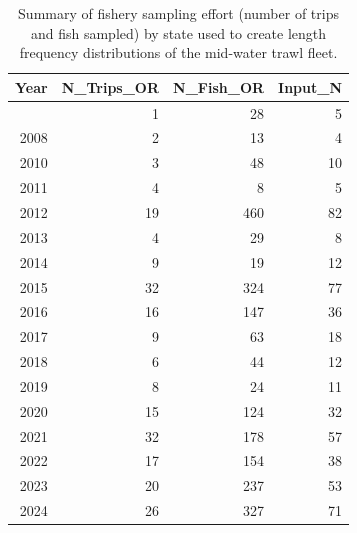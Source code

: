 \documentclass[
]{scrartcl}
\begin{document}
\begin{longtable}{rrrrrrrr}
\end{longtable}

\endgroup

\newpage{}

\begingroup
\fontsize{9.0pt}{10.8pt}\selectfont

\begin{longtable}{rrrr}

\caption{\label{tbl-MDT_lengths_sample_sizes}Summary of fishery sampling
effort (number of trips and fish sampled) by state used to create length
frequency distributions of the mid-water trawl fleet.}

\tabularnewline

\toprule
Year & N\_Trips\_OR & N\_Fish\_OR & Input\_N \\ 
\midrule\addlinespace[2.5pt]
2000 & 1 & 28 & 5 \\ 
2008 & 2 & 13 & 4 \\ 
2010 & 3 & 48 & 10 \\ 
2011 & 4 & 8 & 5 \\ 
2012 & 19 & 460 & 82 \\ 
2013 & 4 & 29 & 8 \\ 
2014 & 9 & 19 & 12 \\ 
2015 & 32 & 324 & 77 \\ 
2016 & 16 & 147 & 36 \\ 
2017 & 9 & 63 & 18 \\ 
2018 & 6 & 44 & 12 \\ 
2019 & 8 & 24 & 11 \\ 
2020 & 15 & 124 & 32 \\ 
2021 & 32 & 178 & 57 \\ 
2022 & 17 & 154 & 38 \\ 
2023 & 20 & 237 & 53 \\ 
2024 & 26 & 327 & 71 \\ 
\bottomrule

\end{longtable}

\endgroup

\newpage{}

\begingroup
\fontsize{9.0pt}{10.8pt}\selectfont
\end{document}
